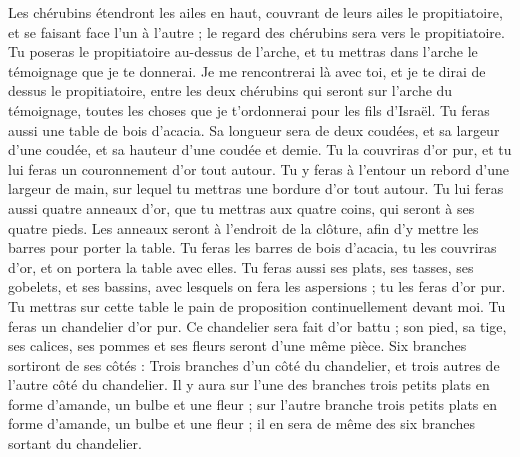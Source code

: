 \begin{multicols}{2}
Les chérubins étendront les ailes en haut, couvrant de leurs ailes le propitiatoire, et se faisant face l’un à l’autre ; le regard des chérubins sera vers le propitiatoire.
Tu poseras le propitiatoire au-dessus de l'arche, et tu mettras dans l'arche le témoignage que je te donnerai.
Je me rencontrerai là avec toi, et je te dirai de dessus le propitiatoire, entre les deux chérubins qui seront sur l'arche du témoignage, toutes les choses que je t’ordonnerai pour les fils d'Israël.
Tu feras aussi une table de bois d’acacia. Sa longueur sera de deux coudées, et sa largeur d'une coudée, et sa hauteur d'une coudée et demie.
Tu la couvriras d’or pur, et tu lui feras un couronnement d'or tout autour.
Tu y feras à l’entour un rebord d’une largeur de main, sur lequel tu mettras une bordure d’or tout autour.
Tu lui feras aussi quatre anneaux d'or, que tu mettras aux quatre coins, qui seront à ses quatre pieds.
Les anneaux seront à l'endroit de la clôture, afin d'y mettre les barres pour porter la table.
Tu feras les barres de bois d’acacia, tu les couvriras d'or, et on portera la table avec elles.
Tu feras aussi ses plats, ses tasses, ses gobelets, et ses bassins, avec lesquels on fera les aspersions ; tu les feras d’or pur.
Tu mettras sur cette table le pain de proposition continuellement devant moi.
Tu feras un chandelier d’or pur. Ce chandelier sera fait d’or battu ; son pied, sa tige, ses calices, ses pommes et ses fleurs seront d’une même pièce.
Six branches sortiront de ses côtés : Trois branches d'un côté du chandelier, et trois autres de l'autre côté du chandelier.
Il y aura sur l’une des branches trois petits plats en forme d'amande, un bulbe et une fleur ; sur l'autre branche trois petits plats en forme d'amande, un bulbe et une fleur ; il en sera de même des six branches sortant du chandelier.

\end{multicols}
